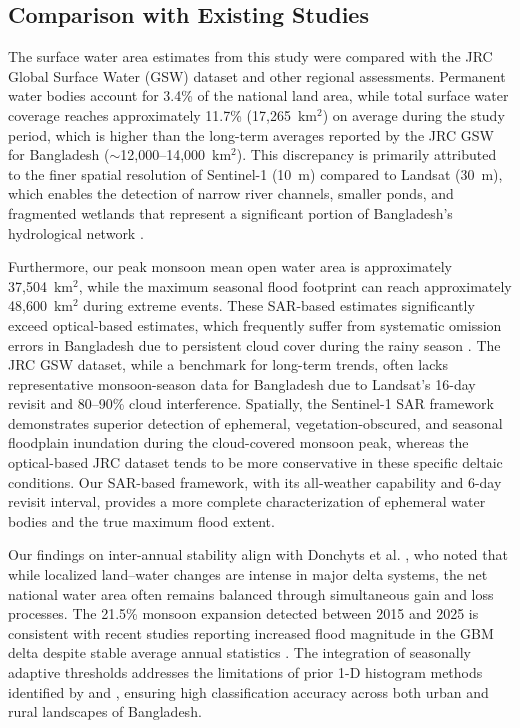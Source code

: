 \documentclass[fleqn,10pt,twocolumn]{article}
\begin{document}
\subsection{Comparison with Existing Studies}
The surface water area estimates from this study were compared with the JRC Global Surface Water (GSW) dataset \cite{pekel2016} and other regional assessments. Permanent water bodies account for 3.4\% of the national land area, while total surface water coverage reaches approximately 11.7\% (17,265~km$^2$) on average during the study period, which is higher than the long-term averages reported by the JRC GSW for Bangladesh ($\sim$12,000--14,000~km$^2$). This discrepancy is primarily attributed to the finer spatial resolution of Sentinel-1 (10~m) compared to Landsat (30~m), which enables the detection of narrow river channels, smaller ponds, and fragmented wetlands that represent a significant portion of Bangladesh's hydrological network \cite{yamazaki2015, chignell2015}.

Furthermore, our peak monsoon mean open water area is approximately 37,504~km$^2$, while the maximum seasonal flood footprint can reach approximately 48,600~km$^2$ during extreme events. These SAR-based estimates significantly exceed optical-based estimates, which frequently suffer from systematic omission errors in Bangladesh due to persistent cloud cover during the rainy season \cite{uddin2019, ticehurst2019}. The JRC GSW dataset, while a benchmark for long-term trends, often lacks representative monsoon-season data for Bangladesh due to Landsat's 16-day revisit and 80--90\% cloud interference. Spatially, the Sentinel-1 SAR framework demonstrates superior detection of ephemeral, vegetation-obscured, and seasonal floodplain inundation during the cloud-covered monsoon peak, whereas the optical-based JRC dataset tends to be more conservative in these specific deltaic conditions. Our SAR-based framework, with its all-weather capability and 6-day revisit interval, provides a more complete characterization of ephemeral water bodies and the true maximum flood extent.

Our findings on inter-annual stability align with Donchyts et al. \cite{donchyts2016}, who noted that while localized land--water changes are intense in major delta systems, the net national water area often remains balanced through simultaneous gain and loss processes. The 21.5\% monsoon expansion detected between 2015 and 2025 is consistent with recent studies reporting increased flood magnitude in the GBM delta despite stable average annual statistics \cite{das2023}. The integration of seasonally adaptive thresholds addresses the limitations of prior 1-D histogram methods identified by \cite{martinis2009} and \cite{ticehurst2019}, ensuring high classification accuracy across both urban and rural landscapes of Bangladesh.
\end{document}
